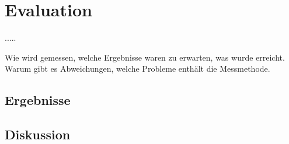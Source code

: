 \section{Evaluation}\label{sec:evaluation}\newpage.\newpage\newpage.\newpage\newpage.\newpage\newpage.\newpage\newpage.\newpage

	Wie wird gemessen, welche Ergebnisse waren zu erwarten, was wurde erreicht. Warum gibt es Abweichungen, welche Probleme enthält die Messmethode.
	
\subsection{Ergebnisse}
\subsection{Diskussion}

